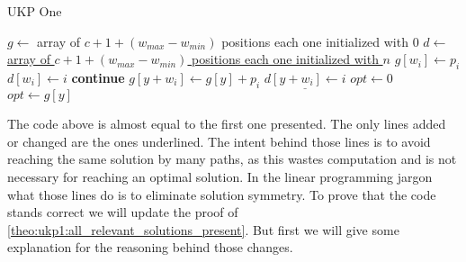 \documentclass[12pt]{article}
\begin{document}
\begin{algorithm}
\caption{UKP One}\label{alg:ukp1}
\begin{algorithmic}[1]
  \State \(g \gets\) array of \(c + 1 + (w_{max} - w_{min})\) positions each one initialized with \(0\)\label{ukp2:create_g}
  \State \underline{\(d \gets\) array of \(c + 1 + (w_{max} - w_{min})\) positions each one initialized with \(n\)\label{ukp2:create_d}}
  \State %
  \label{ukp2:begin_trivial_bounds}
      \State \(g[w_i] \gets p_i\)
      \State \underline{\(d[w_i] \gets i\)}
    \EndIf
  \EndFor\label{ukp2:end_trivial_bounds}
  \State %
  \label{ukp2:main_ext_loop_begin}
    \label{ukp2:if_equal_to_zero}
    	\State \textbf{continue}
    \EndIf\label{ukp2:if_equal_to_zero}
    \State %
    \label{ukp2:main_inner_loop_begin}
      \label{ukp2:if_better_solution_begin}
        \State \(g[y + w_i] \gets g[y] + p_i\)
        \State \(\underline{d[y + w_i] \gets i}\)
      \EndIf\label{ukp2:if_better_solution_end}
    \EndFor\label{ukp2:main_inner_loop_end}
  \EndFor\label{ukp2:main_ext_loop_end}
  \State %
  \State \(opt \gets 0\)
  \label{ukp2:get_opt_loop_begin}
    \label{ukp2:opt_loop_if}
      \State \(opt \gets g[y]\)
    \EndIf
  \EndFor\label{ukp2:get_opt_loop_end}
\EndProcedure
\end{algorithmic}
\end{algorithm}

The code above is almost equal to the first one presented. The only lines added or changed are the ones underlined. The intent behind those lines is to avoid reaching the same solution by many paths, as this wastes computation and is not necessary for reaching an optimal solution. In the linear programming jargon what those lines do is to eliminate solution symmetry. To prove that the code stands correct we will update the proof of \autoref{theo:ukp1:all_relevant_solutions_present}. But first we will give some explanation for the reasoning behind those changes.
\end{document}
